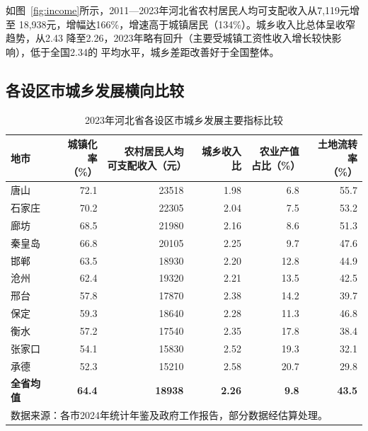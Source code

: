 \documentclass[12pt, a4paper, twoside]{ctexart}
\begin{document}
如图~\ref{fig:income}所示，2011—2023年河北省农村居民人均可支配收入从7,119元增至
18,938元，增幅达166\%，增速高于城镇居民（134\%）。城乡收入比总体呈收窄趋势，从2.43
降至2.26，2023年略有回升（主要受城镇工资性收入增长较快影响），低于全国2.34的
平均水平，城乡差距改善好于全国整体。

\subsection{各设区市城乡发展横向比较}

\begin{table}[H]
  \centering
  \caption{2023年河北省各设区市城乡发展主要指标比较}
  \label{tab:cities}
  \begin{tabularx}{\linewidth}{l r
      r r
      r r}
    \toprule
    \rowcolor{TableHead}
    \color{white}\bfseries 地市 &
    \color{white}\bfseries\makecell{城镇化率\\（\%）} &
    \color{white}\bfseries\makecell{农村居民人均\\可支配收入（元）} &
    \color{white}\bfseries 城乡收入比 &
    \color{white}\bfseries\makecell{农业产值\\占比（\%）} &
    \color{white}\bfseries\makecell{土地流转率\\（\%）} \\
    \midrule
    唐山   & 72.1 & 23518 & 1.98 & 6.8  & 55.7 \\
    \rowcolor{TableRow}
    石家庄 & 70.2 & 22305 & 2.04 & 7.5  & 53.2 \\
    廊坊   & 68.5 & 21980 & 2.16 & 8.6  & 51.3 \\
    \rowcolor{TableRow}
    秦皇岛 & 66.8 & 20105 & 2.25 & 9.7  & 47.6 \\
    邯郸   & 63.5 & 18930 & 2.20 & 12.8 & 44.9 \\
    \rowcolor{TableRow}
    沧州   & 62.4 & 19320 & 2.21 & 13.5 & 42.5 \\
    邢台   & 57.8 & 17870 & 2.38 & 14.2 & 39.7 \\
    \rowcolor{TableRow}
    保定   & 59.3 & 18640 & 2.28 & 11.3 & 46.8 \\
    衡水   & 57.2 & 17540 & 2.35 & 17.8 & 38.4 \\
    \rowcolor{TableRow}
    张家口 & 54.1 & 15830 & 2.52 & 19.3 & 32.1 \\
    承德   & 52.3 & 15210 & 2.58 & 20.7 & 29.8 \\
    \midrule
    \bfseries 全省均值 & \bfseries 64.4 & \bfseries 18938 &
    \bfseries 2.26 & \bfseries 9.8 & \bfseries 43.5 \\
    \bottomrule
    \multicolumn{6}{l}{\footnotesize
      数据来源：各市2024年统计年鉴及政府工作报告，部分数据经估算处理。}
  \end{tabularx}
\end{table}
\end{document}
